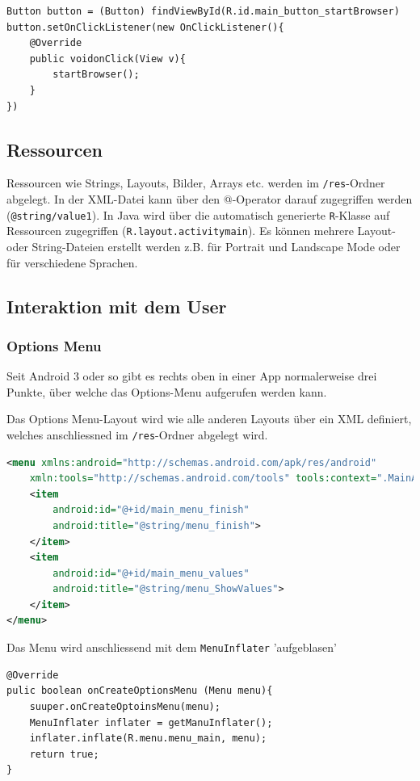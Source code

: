 \documentclass[a4paper, 11pt]{article}
\newcommand{\code}[1]{\texttt{#1}}
\begin{document}
\begin{lstlisting}[captionpos=b, caption={Button Event-Definition in Java}]
Button button = (Button) findViewById(R.id.main_button_startBrowser)
button.setOnClickListener(new OnClickListener(){
	@Override
	public voidonClick(View v){
		startBrowser();
	}
})
\end{lstlisting}

\subsection{Ressourcen}
Ressourcen wie Strings, Layouts, Bilder, Arrays etc. werden im \code{/res}-Ordner abgelegt. In der XML-Datei kann über den @-Operator darauf zugegriffen werden (\code{@string/value1}). In Java wird über die automatisch generierte \code{R}-Klasse auf Ressourcen zugegriffen (\code{R.layout.activity\textunderscore main}). Es können mehrere Layout- oder String-Dateien erstellt werden z.B. für Portrait und Landscape Mode oder für verschiedene Sprachen.

\subsection{Interaktion mit dem User}
\subsubsection{Options Menu}
Seit Android 3 oder so gibt es rechts oben in einer App normalerweise drei Punkte, über welche das Options-Menu aufgerufen werden kann. 

Das Options Menu-Layout wird wie alle anderen Layouts über ein XML definiert, welches anschliessned im \code{/res}-Ordner abgelegt wird. 

\begin{lstlisting}[language=xml, captionpos=b, caption={Beispiel eines Menu Layouts}]
<menu xmlns:android="http://schemas.android.com/apk/res/android"
	xmln:tools="http://schemas.android.com/tools" tools:context=".MainActivity">
	<item
		android:id="@+id/main_menu_finish"
		android:title="@string/menu_finish">
	</item>
	<item
		android:id="@+id/main_menu_values"
		android:title="@string/menu_ShowValues">
	</item>
</menu>
\end{lstlisting}

Das Menu wird anschliessend mit dem \code{MenuInflater} 'aufgeblasen'

\begin{lstlisting}[captionpos=b, caption={Beispiel des Menu-Inflators}]
@Override
pulic boolean onCreateOptionsMenu (Menu menu){
	suuper.onCreateOptoinsMenu(menu);
	MenuInflater inflater = getManuInflater();
	inflater.inflate(R.menu.menu_main, menu);
	return true;
}
\end{lstlisting}
\end{document}
